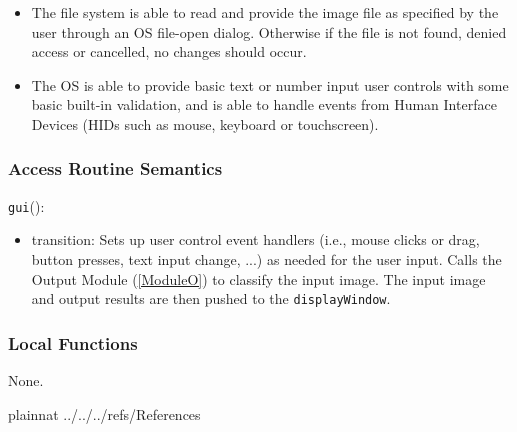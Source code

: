 \documentclass[12pt, titlepage]{article}
\def\code#1{\texttt{#1}}
\begin{document}
\begin{itemize}
  \item The file system is able to read and provide the image file as specified by the user through an OS file-open dialog.
  Otherwise if the file is not found, denied access or cancelled, no changes should occur.
  \item The OS is able to provide basic text or number input user controls with some basic built-in validation, and
  is able to handle events from Human Interface Devices (HIDs such as mouse, keyboard or touchscreen).
\end{itemize}


\subsubsection{Access Routine Semantics}

\noindent \code{gui}():
\begin{itemize}
\item transition: Sets up user control event handlers (i.e., mouse clicks or drag, button presses, text input change, ...) 
as needed for the user input. Calls the Output Module (\ref{ModuleO}) to classify the input
image. The input image and output results are then pushed to the \code{displayWindow}.
\end{itemize}

\subsubsection{Local Functions}

None.
  
\newpage

 {plainnat}
 {../../../refs/References}
\end{document}
